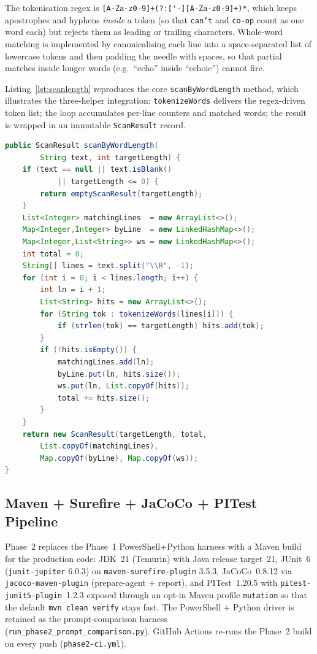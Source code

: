 \documentclass[journal]{IEEEtran}
\begin{document}
The tokenisation regex is \verb|[A-Za-z0-9]+(?:['-][A-Za-z0-9]+)*|, which
keeps apostrophes and hyphens \emph{inside} a token (so that
\texttt{can't} and \texttt{co-op} count as one word each) but rejects
them as leading or trailing characters. Whole-word matching is
implemented by canonicalising each line into a space-separated list of
lowercase tokens and then padding the needle with spaces, so that
partial matches inside longer words (e.g.\ ``echo'' inside ``echoic'')
cannot fire.

Listing~\ref{lst:scanlength} reproduces the core
\texttt{scanByWordLength} method, which illustrates the three-helper
integration: \texttt{tokenizeWords} delivers the regex-driven token
list; the loop accumulates per-line counters and matched words; the
result is wrapped in an immutable \texttt{ScanResult} record.

\begin{lstlisting}[language=Java, label=lst:scanlength,
   caption=Core scanByWordLength method (essential shape).]
public ScanResult scanByWordLength(
        String text, int targetLength) {
    if (text == null || text.isBlank()
            || targetLength <= 0) {
        return emptyScanResult(targetLength);
    }
    List<Integer> matchingLines  = new ArrayList<>();
    Map<Integer,Integer> byLine  = new LinkedHashMap<>();
    Map<Integer,List<String>> ws = new LinkedHashMap<>();
    int total = 0;
    String[] lines = text.split("\\R", -1);
    for (int i = 0; i < lines.length; i++) {
        int ln = i + 1;
        List<String> hits = new ArrayList<>();
        for (String tok : tokenizeWords(lines[i])) {
            if (strlen(tok) == targetLength) hits.add(tok);
        }
        if (!hits.isEmpty()) {
            matchingLines.add(ln);
            byLine.put(ln, hits.size());
            ws.put(ln, List.copyOf(hits));
            total += hits.size();
        }
    }
    return new ScanResult(targetLength, total,
        List.copyOf(matchingLines),
        Map.copyOf(byLine), Map.copyOf(ws));
}
\end{lstlisting}

\subsection{Maven + Surefire + JaCoCo + PITest Pipeline}

Phase~2 replaces the Phase~1 PowerShell+Python harness with a Maven build
for the production code: JDK~21 (Temurin) with Java release target~21,
JUnit~6 (\texttt{junit-jupiter} 6.0.3) on \texttt{maven-surefire-plugin}
3.5.3, JaCoCo~0.8.12 via \texttt{jacoco-maven-plugin} (prepare-agent +
report), and PITest~1.20.5 with \texttt{pitest-junit5-plugin}~1.2.3
exposed through an opt-in Maven profile \texttt{mutation} so that the
default \texttt{mvn clean verify} stays fast. The PowerShell + Python
driver is retained as the prompt-comparison harness
(\texttt{run\_phase2\_prompt\_comparison.py}). GitHub Actions re-runs the
Phase~2 build on every push (\texttt{phase2-ci.yml}).
\end{document}
